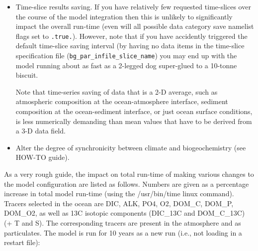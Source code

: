 \documentclass[11pt,fleqn]{book} %
\begin{document}
\begin{itemize}[noitemsep]
\item Time-slice results saving. If you have relatively few requested time-slices over the course of the model integration then this is unlikely to significantly impact the overall run-time (even will all possible data category save namelist flags set to \texttt{.true.}). However, note that if you have accidently triggered the default time-slice saving interval (by having no data items in the time-slice specification file (\texttt{bg\_par\_infile\_slice\_name}) you may end up with the model running about as fast as a 2-legged dog super-glued to a 10-tonne biscuit.

 Note that time-series saving of data that is a 2-D average, such as atmospheric composition at the ocean-atmosphere interface, sediment composition at the ocean-sediment interface, or just ocean surface conditions, is less numerically demanding than mean values that have to be derived from a 3-D data field.

\item Alter the degree of synchronicity between climate and biogeochemistry (see  HOW-TO guide).

\end{itemize}

\vspace{2mm}
As a very rough guide, the impact on total run-time of making various changes to the model configuration are listed as follows. Numbers are given as a percentage increase in total model run-time (using the /usr/bin/time linux command). Tracers selected in the ocean are DIC, ALK, PO4, O2, DOM\_C, DOM\_P, DOM\_O2, as well as 13C isotopic components (DIC\_13C and DOM\_C\_13C) (+ T and S). The corresponding tracers are present in the atmosphere and as particulates. The model is run for 10 years as a new run (i.e., not loading in a restart file):
\end{document}
